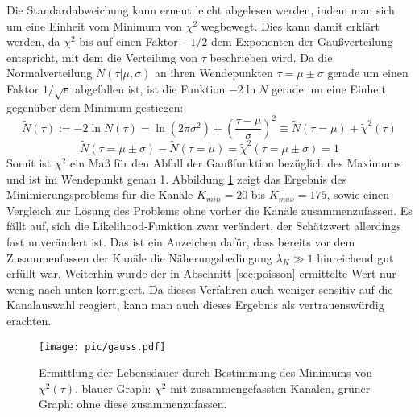     Die Standardabweichung kann erneut leicht abgelesen werden, indem man sich um eine Einheit vom Minimum von $\chi^2$ wegbewegt. Dies kann damit erklärt werden, da $\chi^2$ bis auf einen Faktor $-1/2$ dem Exponenten der Gaußverteilung entspricht, mit dem die Verteilung von $\tau$ beschrieben wird. Da die Normalverteilung $N(\tau|\mu,\sigma)$ an ihren Wendepunkten $\tau = \mu \pm \sigma$ gerade um einen Faktor $1/\sqrt{e}$ abgefallen ist, ist die Funktion $-2 \ln N$ gerade um eine Einheit gegenüber dem Minimum gestiegen:
    	\begin{equation}
    	       \tilde{N}(\tau) := -2 \ln N(\tau) = \ln(2\pi\sigma^2)  + \left(\frac{\tau - \mu}{\sigma}\right)^2 \equiv \tilde{N}(\tau = \mu) + \tilde{\chi}^2(\tau)	
    	\end{equation}
    	\begin{equation}
    	    	\tilde{N}(\tau = \mu \pm \sigma) - \tilde{N}(\tau = \mu) = \tilde{\chi}^2(\tau = \mu \pm \sigma) = 1 	
    	 \end{equation}
    Somit ist $\chi^2$ ein Maß für den Abfall der Gaußfunktion bezüglich des Maximums und ist im Wendepunkt genau 1. Abbildung \ref{fig:LDgauss} zeigt  das Ergebnis des Minimierungsproblems für die Kanäle $K_{min} = 20$ bis $K_{max} = 175$, sowie einen Vergleich zur Lösung des Problems ohne vorher die Kanäle zusammenzufassen. Es fällt auf, sich die Likelihood-Funktion zwar verändert, der Schätzwert allerdings fast unverändert ist. Das ist ein Anzeichen dafür, dass bereits vor dem Zusammenfassen der Kanäle die Näherungsbedingung $\lambda_K \gg 1$ hinreichend gut erfüllt war. Weiterhin wurde der in Abschnitt \ref{sec:poisson} ermittelte Wert nur wenig nach unten korrigiert. Da dieses Verfahren auch weniger sensitiv auf die Kanalauswahl reagiert, kann man auch dieses Ergebnis als vertrauenswürdig erachten.
   		\begin{figure}[ht]
      		   			\centering
      		   			\captionsetup{justification=centering}
      		   			\texttt{[image: pic/gauss.pdf]}
      		   			\caption{Ermittlung der Lebensdauer durch Bestimmung des Minimums von $\chi^2(\tau)$. blauer Graph: $\chi^2$ mit zusammengefassten Kanälen, grüner Graph: ohne diese zusammenzufassen.}
      		   			\label{fig:LDgauss}	
      	\end{figure}
    
      		
      		